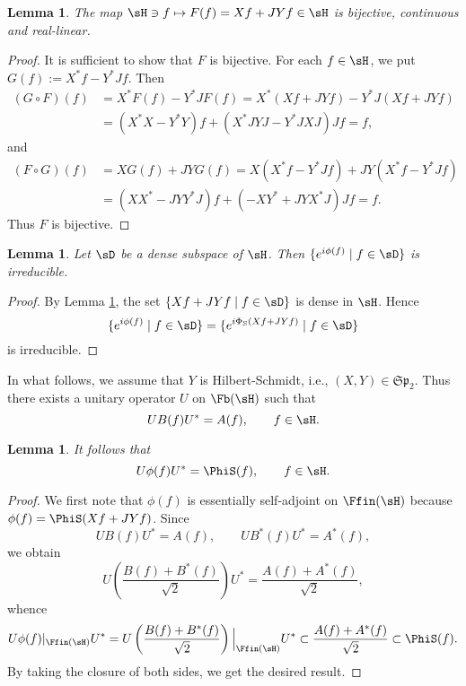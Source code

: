 \documentclass[12pt]{article}
\theoremstyle{plain}
\newtheorem{lem}[theorem]{\bf Lemma}
\numberwithin{equation}{section}
\theoremstyle{remark}
\begin{document}
\begin{lem}\label{bijective}
The map $\sH\ni f\mapsto F(f)=Xf+JYf\in\sH$ is bijective, continuous and real-linear.
\end{lem}

\begin{proof}
It is sufficient to show that $F$ is bijective.
For each $f\in\sH$, we put $G(f):=X^*f-Y^*Jf$.
Then
\begin{align*}
(G\circ F)(f) &= X^*F(f)-Y^*JF(f) = X^*(Xf+JYf)-Y^*J(Xf+JYf)\\
&= (X^*X-Y^*Y)f + (X^*JYJ-Y^*JXJ)Jf=f,
\end{align*}
and
\begin{align*}
(F\circ G)(f) &= XG(f)+JYG(f) = X(X^*f-Y^*Jf)+JY(X^*f-Y^*Jf)\\
&= (XX^*-JYY^*J)f+(-XY^*+JYX^*J)Jf = f.
\end{align*}
Thus $F$ is bijective.
\end{proof}

\begin{lem}\label{irreducible}
Let $\sD $ be a dense subspace of $\sH$.
Then $\{e^{i\phi(f)}\mid f\in\sD \}$ is irreducible.
\end{lem}

\begin{proof}
By Lemma \ref{bijective}, the set $\{Xf+JYf \mid f\in\sD \}$ is dense in $\sH$.
Hence
\[
\{e^{i\phi(f)}\mid f \in \sD \} = \{e^{i\Phi_{\rm S}(Xf+JYf)}\mid f\in \sD \}
\]
is irreducible.
\end{proof}

In what follows, we assume that $Y$ is Hilbert-Schmidt, i.e., $(X,Y)\in\mathfrak{Sp}_2$.
Thus there exists a unitary operator $U$ on $\Fb(\sH)$ such that
\[
 UB(f)U^* = A(f), \qquad f\in\sH.
\] 

\begin{lem}
It follows that
\[
 U\phi(f)U^* = \PhiS(f), \qquad f\in\sH.
\]
\end{lem}

\begin{proof}
We first note that $\phi(f)$ is essentially self-adjoint on $\Ffin(\sH)$ because $\phi(f)=\PhiS(Xf+JYf)$.
Since
\[
 UB(f)U^*=A(f), \qquad UB^*(f)U^*=A^*(f),
\]
we obtain
\[
 U \left( \frac{B(f)+B^*(f)}{\sqrt{2}}\right) U^* = \frac{A(f)+A^*(f)}{\sqrt{2}},
\]
whence
\[
 U\phi(f)|_{\Ffin(\sH)}U^* 
 = U\left(\frac{B(f)+B^*(f)}{\sqrt{2}}\right)\Big|_{\Ffin(\sH)}U^*
   \subset \frac{A(f)+A^*(f)}{\sqrt{2}} \subset \PhiS(f).
\]
By taking the closure of both sides, we get the desired result.
\end{proof}
\end{document}
